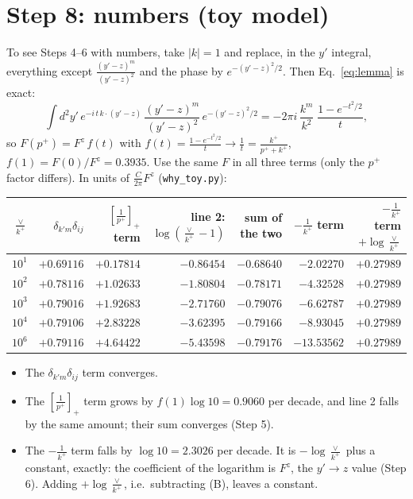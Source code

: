 \documentclass[10pt]{article}
\numberwithin{equation}{section}
\begin{document}
\section{Step 8: numbers (toy model)}\label{sec:toy}
To see Steps 4--6 with numbers, take $|k|=1$ and replace, in the $y'$ integral, everything except $\frac{(y'-z)^m}{(y'-z)^2}$ and the phase by $e^{-(y'-z)^2/2}$. Then Eq.~\eqref{eq:lemma} is exact:
\begin{equation}
\int d^2y'\,e^{-i\,t\,k\cdot(y'-z)}\,\frac{(y'-z)^m}{(y'-z)^2}\,e^{-(y'-z)^2/2}=-2\pi i\,\frac{k^m}{k^2}\;\frac{1-e^{-t^2/2}}{t},
\end{equation}
so $F(p^+)=F^z\,f(t)$ with $f(t)=\frac{1-e^{-t^2/2}}{t}\to\frac1t=\frac{k^+}{p^++k^+}$, $f(1)=F(0)/F^z=0.3935$. Use the same $F$ in all three terms (only the $p^+$ factor differs). In units of $\frac{C}{2\pi}F^z$ (\texttt{why\_toy.py}):
\begin{center}
\begin{tabular}{rrrrrrr}
\toprule
$\frac{\vee}{k^+}$ & $\delta_{k'm}\delta_{ij}$ & $[\frac{1}{p^+}]_+$ term & line 2: $\log(\frac{\vee}{k^+}-1)$ & sum of the two & $-\frac{1}{k^+}$ term & $-\frac{1}{k^+}$ term $+\log\frac{\vee}{k^+}$\\\midrule
$10^{1}$ & $+0.69116$ & $+0.17814$ & $-0.86454$ & $-0.68640$ & $-2.02270$ & $+0.27989$\\
$10^{2}$ & $+0.78116$ & $+1.02633$ & $-1.80804$ & $-0.78171$ & $-4.32528$ & $+0.27989$\\
$10^{3}$ & $+0.79016$ & $+1.92683$ & $-2.71760$ & $-0.79076$ & $-6.62787$ & $+0.27989$\\
$10^{4}$ & $+0.79106$ & $+2.83228$ & $-3.62395$ & $-0.79166$ & $-8.93045$ & $+0.27989$\\
$10^{6}$ & $+0.79116$ & $+4.64422$ & $-5.43598$ & $-0.79176$ & $-13.53562$ & $+0.27989$\\
\bottomrule
\end{tabular}
\end{center}
\begin{itemize}
\item The $\delta_{k'm}\delta_{ij}$ term converges.
\item The $[\frac{1}{p^+}]_+$ term grows by $f(1)\log10=0.9060$ per decade, and line 2 falls by the same amount; their sum converges (Step 5).
\item The $-\frac{1}{k^+}$ term falls by $\log10=2.3026$ per decade. It is $-\log\frac{\vee}{k^+}$ plus a constant, exactly: the coefficient of the logarithm is $F^z$, the $y'\to z$ value (Step 6). Adding $+\log\frac{\vee}{k^+}$, i.e.\ subtracting (B), leaves a constant.
\end{itemize}
\end{document}
